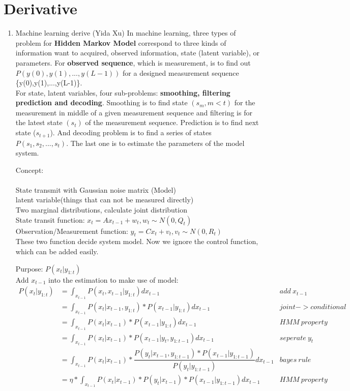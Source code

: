 \documentclass[]{article}
\begin{document}
\section{Derivative}
\begin{enumerate}
	\item Machine learning derive (Yida Xu)
	In machine learning, three types of problem for \textbf{Hidden Markov Model}
	correspond to three kinds of information want to acquired, observed information, state (latent variable), or parameters.
	For \textbf{observed sequence}, which is measurement, is to find out $P(y(0),y(1),...,y(L-1))$ for a designed measurement sequence 
	\{y(0),y(1),...,y(L-1)\}.\\
	For state, latent variables, four sub-problems: \textbf{smoothing, filtering prediction and decoding}. 
	Smoothing is to find state $(s_{m}, m<t)$ for the measurement
	in middle of a given measurement sequence and filtering 
	is for the latest state $(s_t)$ of the measurement sequence.
	Prediction is to find next state ($s_{t+1}$).
	And decoding problem is to find a series of states $P(s_1, s_2, ... , s_t)$.
	The last one is to estimate the parameters of the model system.
		
	Concept: \\
	\\
	State transmit with Gaussian noise matrix (Model)\\
	latent variable(things that can not be measured directly)\\
	Two marginal distributions, calculate joint distribution \\
	State transit function: $x_{t} = Ax_{t-1} + w_t, w_t \sim N(0, Q_t)$ \\
	Observation/Measurement function: $y_t = Cx_{t}+v_t, v_t \sim N(0, R_t)$ \\
	These two function decide system model. 
	Now we ignore the control function, which can be added easily.
	
	Purpose: $P(x_t|y_{1:t})$\\
	Add $x_{t-1}$ into the estimation to make use of model:\\
	\begin{align*} \label{ekf01}
			P(x_t|y_{1:t}) &= \int_{x_{t-1}} P(x_t,x_{t-1}|y_{1:t})dx_{t-1} 
			&add\  x_{t-1} \\ &= \int_{x_{t-1}} P(x_t|x_{t-1},y_{1:t})*P(x_{t-1}|y_{1:t})dx_{t-1} & joint->conditional\\&=\int_{x_{t-1}} P(x_t|x_{t-1})*P(x_{t-1}|y_{1:t})dx_{t-1} &HMM\ property\\ &= \int_{x_{t-1}} P(x_t|x_{t-1})*P(x_{t-1}|y_t, y_{1:t-1})dx_{t-1} & seperate\ y_t\\&=\int_{x_{t-1}} P(x_t|x_{t-1})*\dfrac{P(y_t| x_{t-1},y_{1:t-1}) * P(x_{t-1}|y_{1:t-1})}{P({y_t|y_{1:t-1}})}dx_{t-1} & bayes\ rule
			\\&=\eta *\int_{x_{t-1}} P(x_t|x_{t-1})*P(y_t|x_{t-1}) * P(x_{t-1}|y_{1:t-1})dx_{t-1}&HMM\ property
	\end{align*}
	

\end{enumerate}
\end{document}
